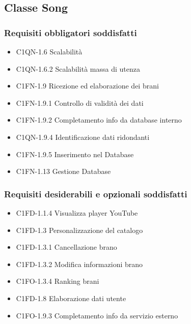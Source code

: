 \subsection{Classe Song}
\subsubsection*{Requisiti obbligatori soddisfatti}
\begin{itemize}
    \item C1QN-1.6 Scalabilit\`a
    \item C1QN-1.6.2 Scalabilit\`a massa di utenza
	\item C1FN-1.9 Ricezione ed elaborazione dei brani
	\item C1FN-1.9.1 Controllo di validit\`a dei dati
	\item C1FN-1.9.2 Completamento info da database interno
	\item C1QN-1.9.4 Identificazione dati ridondanti
	\item C1FN-1.9.5 Inserimento nel Database
	\item C1FN-1.13 Gestione Database
\end{itemize}
\subsubsection*{Requisiti desiderabili e opzionali soddisfatti}
\begin{itemize}
    \item C1FD-1.1.4 Visualizza player YouTube
    \item C1FD-1.3 Personalizzazione del catalogo
    \item C1FD-1.3.1 Cancellazione brano
    \item C1FD-1.3.2 Modifica informazioni brano
    \item C1FO-1.3.4 Ranking brani
    \item C1FD-1.8 Elaborazione dati utente
    \item C1FO-1.9.3 Completamento info da servizio esterno
\end{itemize}
